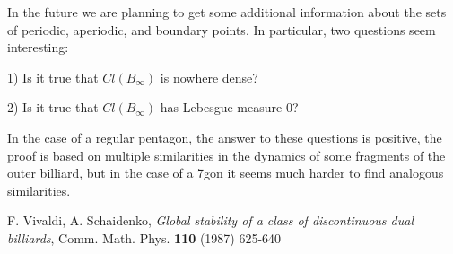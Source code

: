 \documentclass[a4paper, 12pt]{article}
\begin{document}
In the future we are planning to get some additional information about the sets of periodic, aperiodic, and boundary points. In particular, two questions seem interesting: 

1) Is it true that $Cl(B_{\infty})$ is nowhere dense?

2) Is it true that $Cl(B_{\infty})$ has Lebesgue measure 0?

In the case of a regular pentagon, the answer to these questions is positive, the proof is based on multiple similarities in the dynamics of some fragments of the outer billiard, but in the case of a 7gon it seems much harder to find analogous similarities.

\begin{thebibliography}{}
 F. Vivaldi, A. Schaidenko, \emph{Global stability of a class of discontinuous dual billiards}, Comm. Math. Phys. \textbf{110} (1987) 625-640
\end{thebibliography}
\end{document}
